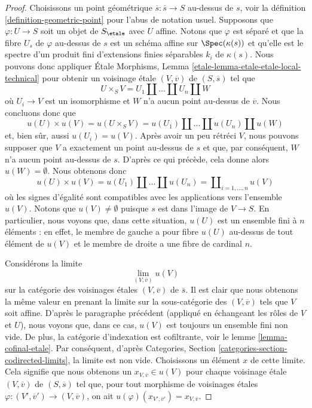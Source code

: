 \begin{proof}
\medskip\noindent
Choisissons un point g\'eom\'etrique $\overline{s} : \overline{s} \to S$ au-dessus de $s$, voir la
d\'efinition \ref{definition-geometric-point}
pour l'abus de notation usuel. Supposons que $\varphi : U \to S$ soit un objet
de $S_\etale$ avec $U$ affine. Notons que $\varphi$ est s\'epar\'e et
que la fibre $U_s$ de $\varphi$ au-dessus de $s$ est un sch\'ema affine sur
$\Spec(\kappa(s))$ et qu'elle est le spectre d'un produit fini
d'extensions finies s\'eparables $k_i$ de $\kappa(s)$. Nous pouvons donc appliquer
\'Etale Morphisms, Lemma \ref{etale-lemma-etale-etale-local-technical}
pour obtenir un voisinage \'etale $(V, \overline{v})$ de $(S, \overline{s})$
tel que
$$
U \times_S V = U_1 \amalg \ldots \amalg U_n \amalg W
$$
o\`u $U_i \to V$ est un isomorphisme et $W$ n'a aucun point au-dessus de
$\overline{v}$. Nous concluons donc que
$$
u(U) \times u(V) =
u(U \times_S V) =
u(U_1) \amalg \ldots \amalg u(U_n) \amalg u(W)
$$
et, bien s\^ur, aussi $u(U_i) = u(V)$. Apr\`es avoir un peu r\'etr\'eci $V$, nous pouvons
supposer que $V$ a exactement un point au-dessus de $s$ et que, par cons\'equent, $W$ n'a aucun
point au-dessus de $s$. D'apr\`es ce qui pr\'ec\`ede, cela donne alors $u(W) = \emptyset$.
Nous obtenons donc
$$
u(U) \times u(V) =
u(U_1) \amalg \ldots \amalg u(U_n) =
\coprod\nolimits_{i = 1, \ldots, n} u(V)
$$
o\`u les signes d'\'egalit\'e sont compatibles avec les applications vers l'ensemble $u(V)$.
Notons que $u(V) \not = \emptyset$ puisque $s$ est dans l'image de $V \to S$.
En particulier, nous voyons que, dans cette situation, $u(U)$ est un
ensemble fini \`a $n$ \'el\'ements : en effet, le membre de gauche a pour fibre $u(U)$ au-dessus de
tout \'el\'ement de $u(V)$ et le membre de droite a une fibre de cardinal $n$.

\medskip\noindent
Consid\'erons la limite
$$
\lim_{(V, \overline{v})} u(V)
$$
sur la cat\'egorie des voisinages \'etales $(V, \overline{v})$ de
$\overline{s}$. Il est clair que nous obtenons la m\^eme valeur en prenant
la limite sur la sous-cat\'egorie des $(V, \overline{v})$ tels que $V$ soit affine.
D'apr\`es le paragraphe pr\'ec\'edent (appliqu\'e en \'echangeant les r\^oles de $V$ et $U$),
nous voyons que, dans ce cas, $u(V)$ est toujours un ensemble fini non vide.
De plus, la cat\'egorie d'indexation est cofiltrante, voir le
lemme \ref{lemma-cofinal-etale}.
Par cons\'equent, d'apr\`es
Categories, Section \ref{categories-section-codirected-limits},
la limite est non vide. Choisissons un \'el\'ement $x$ de cette limite.
Cela signifie que nous obtenons un $x_{V, \overline{v}} \in u(V)$ pour
chaque voisinage \'etale $(V, \overline{v})$ de $(S, \overline{s})$
tel que, pour tout morphisme de voisinages \'etales
$\varphi : (V', \overline{v}') \to (V, \overline{v})$, on ait
$u(\varphi)(x_{V', \overline{v}'}) = x_{V, \overline{v}}$.


\end{proof}
